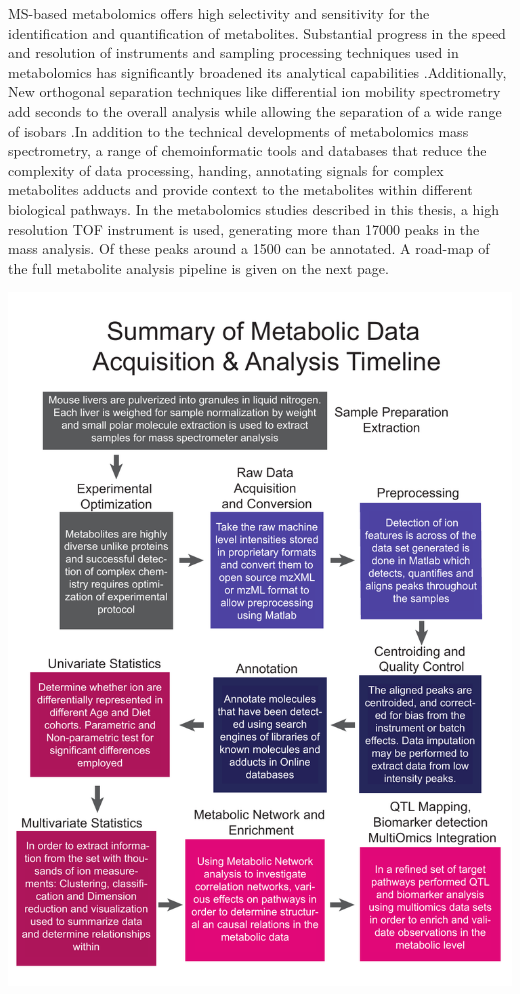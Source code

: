 \documentclass[a4paper,11pt,twoside]{book}
\begin{document}
	MS-based metabolomics offers high selectivity and sensitivity for the identification and quantification of metabolites. Substantial progress in the speed and resolution of instruments and sampling processing techniques used in metabolomics has significantly broadened its analytical capabilities \citep{Aksenov2017GlobalSpectrometry}.Additionally, New orthogonal separation techniques like differential ion mobility spectrometry add seconds to the overall analysis while allowing the separation of a wide range of isobars \citep{Domalain2014EnantiomericSpectrometry}.In addition to the technical developments of metabolomics mass spectrometry, a range of chemoinformatic tools and databases that reduce the complexity of data processing, handing\citep{Xia2016UsingAnalysis}, annotating signals for complex metabolites adducts and provide context to the metabolites within different biological pathways\citep{Wishart2013HMDB2013,Xia2010MSEA}. In the metabolomics studies described in this thesis, a high resolution TOF instrument is used, generating more than 17000 peaks in the mass analysis. Of these peaks around a 1500 can be annotated. A road-map of the full metabolite analysis pipeline is given on the next page.
	
	
	
	\includegraphics[width=1.2\linewidth]{3.Metabolomics/pipeline.pdf}
	
\end{document}
